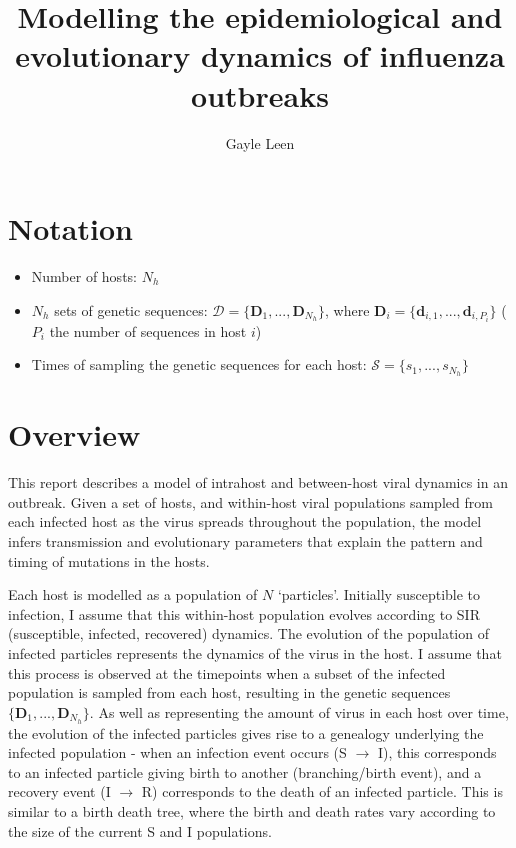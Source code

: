 \documentclass[a4paper,18pt]{report}
\title{Modelling the epidemiological and evolutionary dynamics of influenza outbreaks}
\author{Gayle Leen}
\begin{document}
\maketitle

\begin{abstract}

\end{abstract}
\section{Notation}
\begin{itemize}
\item Number of hosts: $N_h$
\item $N_h$ sets of genetic sequences: $\mathcal{D} = \{\mathbf{D}_1,...,\mathbf{D}_{N_h}\}$, where $\mathbf{D}_i = \{\mathbf{d}_{i,1},...,\mathbf{d}_{i,P_i}\}$ ($P_i$ the number of sequences in host $i$)
\item Times of sampling the genetic sequences for each host: $\mathcal{S} = \{s_1,...,s_{N_h}\}$
\end{itemize}

\section{Overview}
This report describes a model of intrahost and between-host viral dynamics in an outbreak. Given a set of hosts, and within-host viral populations sampled from each infected host as the virus spreads throughout the population, the model infers transmission and evolutionary parameters                                                                   
that explain the pattern and timing of mutations in the hosts.

Each host is modelled as a population of $N$ `particles'. Initially susceptible to infection, I assume that this within-host population evolves according to SIR (susceptible, infected, recovered) dynamics. The evolution of the population of infected particles represents the dynamics of the virus in the host. I assume that this process is observed at the timepoints when a subset of the infected population is sampled from each host, resulting in the genetic sequences $\{\mathbf{D}_1,...,\mathbf{D}_{N_h}\}$. As well as representing the amount of virus in each host over time, the evolution of the infected particles gives rise to a genealogy underlying the infected population - when an infection event occurs (S $\rightarrow$ I), this corresponds to an infected particle giving birth to another (branching/birth event),
and a recovery event (I $\rightarrow$ R) corresponds to the death of an infected particle. This is similar to a birth death tree, where the birth and death rates vary according to the size of the current S and I populations.
\end{document}
